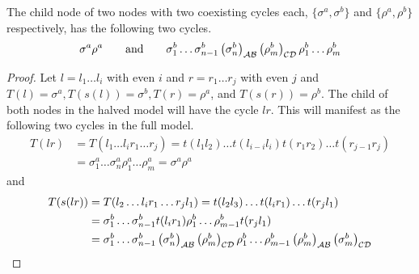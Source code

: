 \begin{theorem}
	The child node of two nodes with two coexisting cycles each, $\{\sigma^a, \sigma^b\}$ and $\{\rho^a, \rho^b\}$ respectively, has the following two cycles.
	\begin{align*}
		\sigma^a\rho^a \qquad \text{and} \qquad
		\sigma^b_1 \dots \sigma^b_{n-1} \left(\sigma^b_n\right)_{\mathcal{A}\mathcal{B}} \left(\rho^b_m\right)_{\mathcal{C}\mathcal{D}} \rho^b_1 \dots \rho^b_m
	\end{align*}
\end{theorem}

\begin{proof}
	Let $l = l_1 \dots l_i$ with even $i$ and $r = r_1 \dots r_j$ with even $j$ and $T(l) = \sigma^a, T(s(l)) = \sigma^b, T(r) = \rho^a$, and $T(s(r)) = \rho^b$.
	The child of both nodes in the halved model will have the cycle $lr$.
	This will manifest as the following two cycles in the full model.
	\begin{align*}
		T(lr) & = T(l_1 \dots l_i r_1 \dots r_j) = t(l_1l_2) \dots t(l_{i-i}l_i) t(r_1r_2) \dots t(r_{j-1}r_j) \\
		      & = \sigma^a_1 \dots \sigma^a_n \rho^a_1 \dots \rho^a_m = \sigma^a\rho^a
	\end{align*}
	and
	\begin{align*}
		T(s(lr)) & = T(l_2 \dots l_i r_1 \dots r_j l_1) = t(l_2l_3) \dots t(l_ir_1) \dots t(r_jl_1)              \\
		         & = \sigma^b_1 \dots \sigma^b_{n-1} t(l_ir_1) \rho^b_1 \dots \rho^b_{m-1} t(r_jl_1)             \\
		         & = \sigma^b_1 \dots \sigma^b_{n-1} \left(\sigma^b_n\right)_{\mathcal{A}\mathcal{B}} \left(\rho^b_m\right)_{\mathcal{C}\mathcal{D}}
		\rho^b_1 \dots \rho^b_{m-1} \left(\rho^b_m\right)_{\mathcal{A}\mathcal{B}} \left(\sigma^b_m\right)_{\mathcal{C}\mathcal{D}}
	\end{align*}
\end{proof}